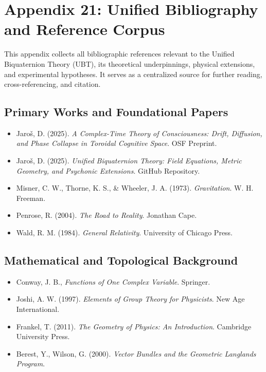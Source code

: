 \appendix
\section*{Appendix 21: Unified Bibliography and Reference Corpus}

This appendix collects all bibliographic references relevant to the Unified Biquaternion Theory (UBT), its theoretical underpinnings, physical extensions, and experimental hypotheses. It serves as a centralized source for further reading, cross-referencing, and citation.

\subsection*{Primary Works and Foundational Papers}
\begin{itemize}
  \item Jaroš, D. (2025). \textit{A Complex-Time Theory of Consciousness: Drift, Diffusion, and Phase Collapse in Toroidal Cognitive Space}. OSF Preprint.
  \item Jaroš, D. (2025). \textit{Unified Biquaternion Theory: Field Equations, Metric Geometry, and Psychonic Extensions}. GitHub Repository.
  \item Misner, C. W., Thorne, K. S., & Wheeler, J. A. (1973). \textit{Gravitation}. W. H. Freeman.
  \item Penrose, R. (2004). \textit{The Road to Reality}. Jonathan Cape.
  \item Wald, R. M. (1984). \textit{General Relativity}. University of Chicago Press.
\end{itemize}

\subsection*{Mathematical and Topological Background}
\begin{itemize}
  \item Conway, J. B., \textit{Functions of One Complex Variable}. Springer.
  \item Joshi, A. W. (1997). \textit{Elements of Group Theory for Physicists}. New Age International.
  \item Frankel, T. (2011). \textit{The Geometry of Physics: An Introduction}. Cambridge University Press.
  \item Berest, Y., Wilson, G. (2000). \textit{Vector Bundles and the Geometric Langlands Program}.
\end{itemize}

